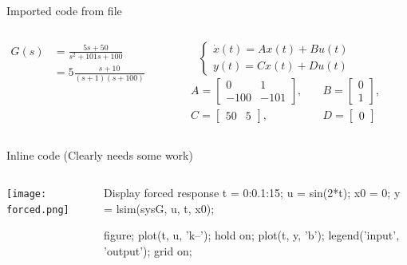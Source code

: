 \documentclass[11pt,aspectratio=169,t]{beamer}
\begin{document}
    \begin{frame}{Imported code from file}
        \vfill
        \vspace{-0.5cm}
        \begin{columns}
        {\color{black}
        \begin{align*}
            G(s) &= \frac{5s+50}{s^2+101s+100}\\ 
            &= 5\frac{s+10}{(s+1)(s+100)}
        \end{align*}

        \bigskip
        $$ \begin{cases}\dot{x}(t) = Ax(t) + Bu(t)\\
        y(t) = Cx(t) + D u(t)
        \end{cases}$$
        \begin{align*}
            &A=\begin{bmatrix}0&1\\-100&-101\end{bmatrix}, 
        \quad &B =\begin{bmatrix}0\\1\end{bmatrix}, \\
        \quad &C =\begin{bmatrix}50&5\end{bmatrix}, 
        \quad &D =\begin{bmatrix}0\end{bmatrix}
        \end{align*}}

        \end{columns}
        \vfill
    \end{frame}

    \begin{frame}{Inline code (Clearly needs some work)}
        \vfill
        \hspace{-2cm}
        \begin{columns}
        \vspace{-0cm}
        \hspace{-1cm}\texttt{[image: forced.png]}
        \vspace{-6cm}\hspace{-2cm}
        \begin{code}{Display forced response}
        t = 0:0.1:15;  
        u = sin(2*t);   
        x0 = 0;         
        y = lsim(sysG, u, t, x0);
        
        figure;
        plot(t, u, 'k--');
        hold on;
        plot(t, y, 'b');
        legend('input', 'output');
        grid on;
        \end{code}
        \end{columns}
        \vfill
    \end{frame}
\end{document}
